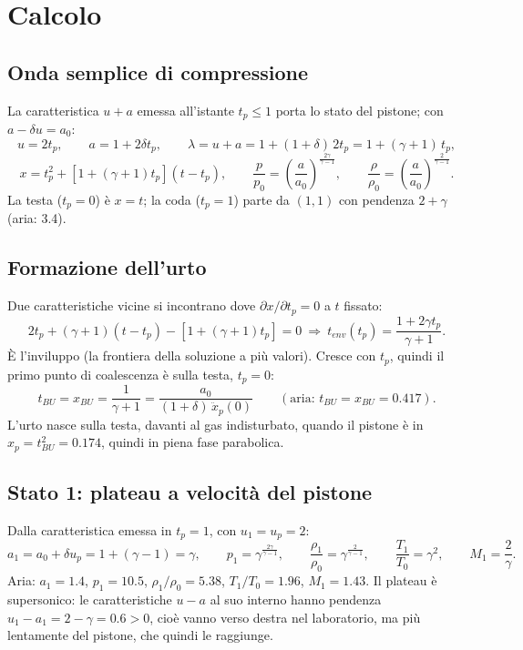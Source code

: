 \documentclass[11pt,a4paper]{article}
\newcommand{\uma}{u-a}
\newcommand{\upa}{u+a}
\begin{document}
\section{Calcolo}

\subsection*{Onda semplice di compressione}
La caratteristica $\upa$ emessa all'istante $t_p\le1$ porta lo stato del pistone; con $a-\delta u=a_0$:
\[
u=2t_p,\qquad a=1+2\delta t_p,\qquad \lambda=u+a=1+(1+\delta)\,2t_p=1+(\gamma+1)\,t_p,
\]
\[
x=t_p^2+\left[1+(\gamma+1)t_p\right](t-t_p),\qquad
\frac{p}{p_0}=\left(\frac{a}{a_0}\right)^{\frac{2\gamma}{\gamma-1}},\qquad
\frac{\rho}{\rho_0}=\left(\frac{a}{a_0}\right)^{\frac{2}{\gamma-1}}.
\]
La testa ($t_p=0$) è $x=t$; la coda ($t_p=1$) parte da $(1,1)$ con pendenza $2+\gamma$ (aria: \num{3.4}).

\subsection*{Formazione dell'urto}
Due caratteristiche vicine si incontrano dove $\partial x/\partial t_p=0$ a $t$ fissato:
\[
2t_p+(\gamma+1)(t-t_p)-\left[1+(\gamma+1)t_p\right]=0
\ \Rightarrow\ t_{env}(t_p)=\frac{1+2\gamma t_p}{\gamma+1}.
\]
È l'inviluppo (la frontiera della soluzione a più valori). Cresce con $t_p$, quindi il primo punto di
coalescenza è sulla testa, $t_p=0$:
\[
t_{BU}=x_{BU}=\frac{1}{\gamma+1}=\frac{a_0}{(1+\delta)\,\ddot x_p(0)}\qquad(\text{aria: }t_{BU}=x_{BU}=\num{0.417}).
\]
L'urto nasce sulla testa, davanti al gas indisturbato, quando il pistone è in $x_p=t_{BU}^2=\num{0.174}$, quindi
in piena fase parabolica.

\subsection*{Stato 1: plateau a velocità del pistone}
Dalla caratteristica emessa in $t_p=1$, con $u_1=u_p=2$:
\[
a_1=a_0+\delta u_p=1+(\gamma-1)=\gamma,\qquad
p_1=\gamma^{\frac{2\gamma}{\gamma-1}},\qquad
\frac{\rho_1}{\rho_0}=\gamma^{\frac{2}{\gamma-1}},\qquad \frac{T_1}{T_0}=\gamma^2,\qquad M_1=\frac{2}{\gamma}.
\]
Aria: $a_1=\num{1.4}$, $p_1=\num{10.5}$, $\rho_1/\rho_0=\num{5.38}$, $T_1/T_0=\num{1.96}$, $M_1=\num{1.43}$.
Il plateau è supersonico: le caratteristiche $\uma$ al suo interno hanno pendenza $u_1-a_1=2-\gamma=\num{0.6}>0$,
cioè vanno verso destra nel laboratorio, ma più lentamente del pistone, che quindi le raggiunge.
\end{document}
